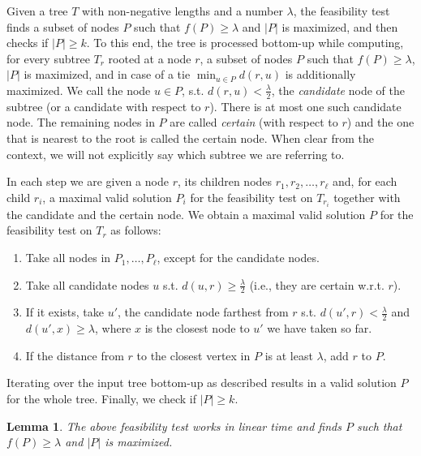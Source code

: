 \documentclass[11pt,a4paper]{article}
\newtheorem{lemma}{Lemma}
\theoremstyle{definition}
\theoremstyle{remark}
\begin{document}
Given a tree $T$ with non-negative lengths and a number $\lambda$, the feasibility test finds a subset of nodes $P$ such that $f(P)\geq\lambda$
and $|P|$ is maximized, and then checks if $|P|\geq k$.
To this end, the tree is processed bottom-up while computing, for every subtree $T_{r}$ rooted at a node $r$, a subset of nodes $P$ such that
$f(P)\geq\lambda$, $|P|$ is maximized, and in case of a tie $\min_{u\in P}d(r,u)$ is additionally maximized.
We call the node $u\in P$, s.t. $d(r,u)<\frac{\lambda}{2}$, the \emph{candidate} node of the subtree (or a candidate with respect to $r$). There is at most one such candidate node.
The remaining nodes in $P$ are called \emph{certain} (with respect to $r$) and the one that is nearest to the root is called the certain node.
When clear from the context, we will not explicitly say which subtree we are referring to.

In each step we are given a node $r$, its children nodes $r_{1},r_{2},\ldots,r_{\ell}$ and, for each child $r_{i}$, a maximal valid
solution $P_{i}$ for the feasibility test on $T_{r_{i}}$ together with the candidate and the certain node. We obtain a maximal valid solution $P$ for the feasibility test on $T_{r}$ as follows:
\begin{enumerate}
\item Take all nodes in $P_{1},\ldots,P_{\ell}$, except for the candidate nodes.\label{linear time step 1}
\item Take all candidate nodes $u$ s.t. $d(u,r) \geq \frac{\lambda}{2}$ (i.e., they are certain w.r.t. $r$).\label{linear time step 2}
\item If it exists, take $u'$, the candidate node farthest from $r$ s.t. $d(u',r) < \frac{\lambda}{2}$ and $d(u',x)\geq \lambda$, where $x$ is the closest node to $u'$ we have taken so far.\label{linear time step 3}
\item If the distance from $r$ to the closest vertex in $P$ is at least $\lambda$, add $r$ to $P$.\label{linear time step 4}
\end{enumerate}
Iterating over the input tree bottom-up as described results in a valid solution $P$ for the whole tree. Finally, we check if $|P|\geq k$.

\begin{lemma}
\label{lineartimecorrectness}
The above feasibility test works in linear time and finds $P$ such that $f(P)\geq\lambda$ and $|P|$ is maximized.
\end{lemma}
\end{document}
